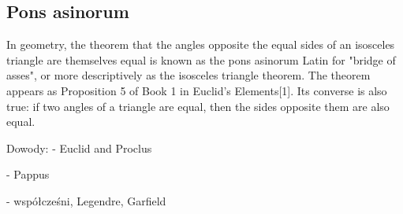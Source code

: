 \subsection{Pons asinorum}
In geometry, the theorem that the angles opposite the equal sides of an isosceles triangle are themselves equal is known as the pons asinorum Latin for "bridge of asses", or more descriptively as the isosceles triangle theorem. The theorem appears as Proposition 5 of Book 1 in Euclid's Elements[1]. Its converse is also true: if two angles of a triangle are equal, then the sides opposite them are also equal. 

Dowody:
- Euclid and Proclus

- Pappus

- współcześni, Legendre, Garfield
